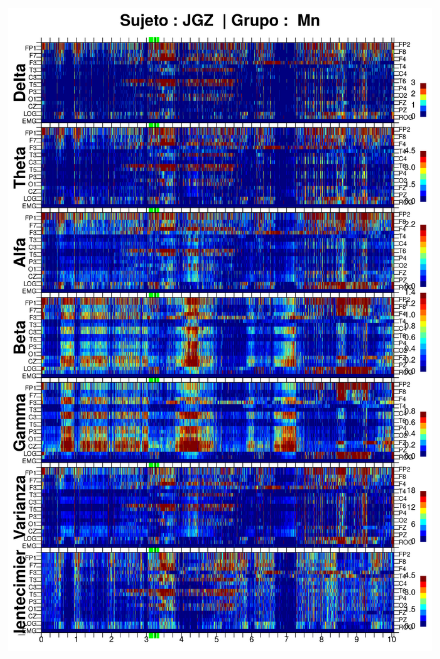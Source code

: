 \begin{figure}
\centering
\includegraphics[width=0.9\linewidth]
{./enlentecimiento/JGMN6SUE_espectral_total.png} 
\end{figure}

